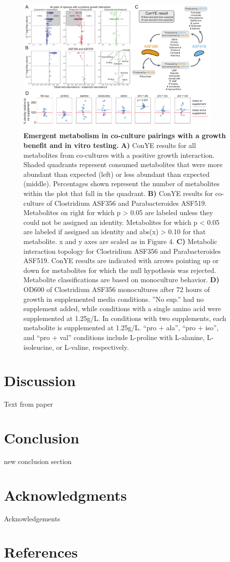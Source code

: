 \documentclass[11pt,twocolumn,notitlepage,openany,twoside]{book}
\begin{document}
\begin{figure}
\centering
\includegraphics[width=0.9\textwidth]{ch2_fig6}
\caption[Emergent metabolism in co-culture pairings with a growth benefit and in vitro testing.]{\textbf{Emergent metabolism in co-culture pairings with a growth benefit and in vitro testing.} \textbf{A)} ConYE results for all metabolites from co-cultures with a positive growth interaction. Shaded quadrants represent consumed metabolites that were more abundant than expected (left) or less abundant than expected (middle). Percentages shown represent the number of metabolites within the plot that fall in the quadrant. \textbf{B)} ConYE results for co-culture of Clostridium ASF356 and Parabacteroides ASF519. Metabolites on right for which p > 0.05 are labeled unless they could not be assigned an identity. Metabolites for which p < 0.05 are labeled if assigned an identity and abs(x) > 0.10 for that metabolite. x and y axes are scaled as in Figure 4. \textbf{C)} Metabolic interaction topology for Clostridium ASF356 and Parabacteroides ASF519. ConYE results are indicated with arrows pointing up or down for metabolites for which the null hypothesis was rejected. Metabolite classifications are based on monoculture behavior. \textbf{D)} OD600 of Clostridium ASF356 monocultures after 72 hours of growth in supplemented media conditions. ”No sup.” had no supplement added, while conditions with a single amino acid were supplemented at 1.25g/L. In conditions with two supplements, each metabolite is supplemented at 1.25g/L. “pro + ala”, “pro + iso”, and “pro + val” conditions include L-proline with L-alanine, L-isoleucine, or L-valine, respectively.}
\end{figure}

\section{Discussion}

Text from paper

\section{Conclusion}

new conclusion section

\section{Acknowledgments}

Acknowledgements

\section{References}

\end{document}
